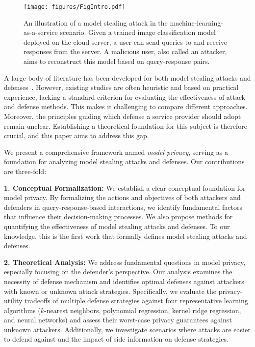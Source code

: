     \begin{figure}
        \centering
        \texttt{[image: figures/FigIntro.pdf]}
        \caption{An illustration of a model stealing attack in the machine-learning-as-a-service scenario. Given a trained image classification model deployed on the cloud server, a user can send queries to and receive responses from the server. A malicious user, also called an attacker, aims to reconstruct this model based on query-response pairs.}
        \label{fig:MLaaS}
    \end{figure}

    
    A large body of literature has been developed for both model stealing attacks and defenses~\citep[see, e.g.,][]{tramer2016stealing,papernot2016practical,chandrasekaran2018model,milli2019model,kesarwani2018model,juuti2019prada,lee2019defending,orekondy2019prediction,wang2020information,oliynyk2023know}. However, existing studies are often heuristic and based on practical experience, lacking a standard criterion for evaluating the effectiveness of attack and defense methods. This makes it challenging to compare different approaches. Moreover, the principles guiding which defense a service provider should adopt remain unclear. Establishing a theoretical foundation for this subject is therefore crucial, and this paper aims to address this gap.

    We present a comprehensive framework named \textit{model privacy}, serving as a foundation for analyzing model stealing attacks and defenses. Our contributions are three-fold:

    \textbf{1. Conceptual Formalization:} We establish a clear conceptual foundation for model privacy. By formalizing the actions and objectives of both attackers and defenders in query-response-based interactions, we identify fundamental factors that influence their decision-making processes. We also propose methods for quantifying the effectiveness of model stealing attacks and defenses. To our knowledge, this is the first work that formally defines model stealing attacks and defenses. 

    \textbf{2. Theoretical Analysis:} We address fundamental questions in model privacy, especially focusing on the defender's perspective. Our analysis examines the necessity of defense mechanism and identifies optimal defenses against attackers with known or unknown attack strategies. Specifically, we evaluate the privacy-utility tradeoffs of multiple defense strategies against four representative learning algorithms ($k$-nearest neighbors, polynomial regression, kernel ridge regression, and neural networks) and assess their worst-case privacy guarantees against unknown attackers. Additionally, we investigate scenarios where attacks are easier to defend against and the impact of side information on defense strategies.

